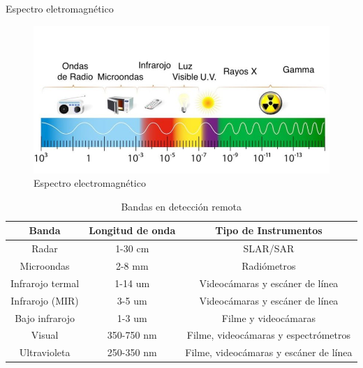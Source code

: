 \begin{frame}{Espectro eletromagnético}
    \begin{figure}
        \centering
        \includegraphics[scale=0.2]{img/section_03/espectro-electromagnetico.jpg}
        \caption{Espectro electromagnético}
        \label{fig:section_03_espectro_electromagnetico}
    \end{figure}
    
    \tiny
    \begin{table}
        \centering
        \begin{tabular}{c|c|c}
            \hline
            Banda & Longitud de onda & Tipo de Instrumentos \\
            \hline
            Radar & 1-30 cm & SLAR/SAR \\
            Microondas & 2-8 mm & Radiómetros \\
            Infrarojo termal & 1-14 um & Videocámaras y escáner de línea \\
            Infrarojo (MIR) & 3-5 um & Videocámaras y escáner de línea \\
            Bajo infrarojo & 1-3 um & Filme y videocámaras \\
            Visual & 350-750 nm & Filme, videocámaras y espectrómetros \\
            Ultravioleta & 250-350 nm & Filme, videocámaras y escáner de línea
            \hline
        \end{tabular}
        \caption{Bandas en detección remota}
        \label{tab:bandas_deteccion_remota}
    \end{table}
\end{frame}

